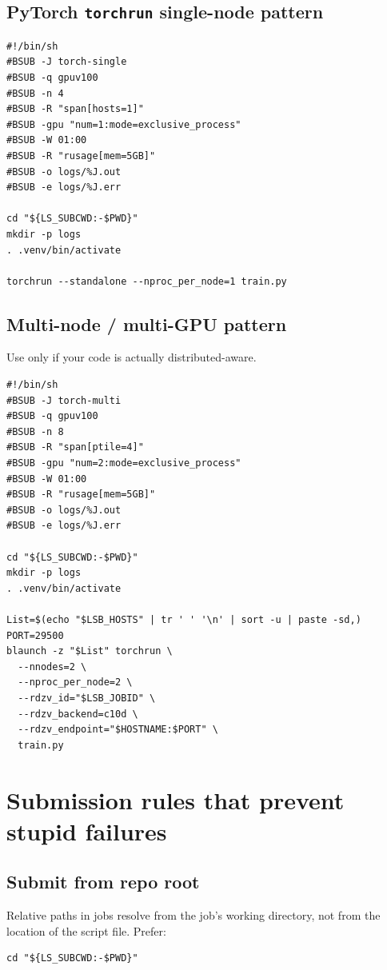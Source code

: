 \documentclass[11pt,a4paper]{article}
\begin{document}
\subsection{PyTorch \texttt{torchrun} single-node pattern}

\begin{lstlisting}[style=shell]
#!/bin/sh
#BSUB -J torch-single
#BSUB -q gpuv100
#BSUB -n 4
#BSUB -R "span[hosts=1]"
#BSUB -gpu "num=1:mode=exclusive_process"
#BSUB -W 01:00
#BSUB -R "rusage[mem=5GB]"
#BSUB -o logs/%J.out
#BSUB -e logs/%J.err

cd "${LS_SUBCWD:-$PWD}"
mkdir -p logs
. .venv/bin/activate

torchrun --standalone --nproc_per_node=1 train.py
\end{lstlisting}

\subsection{Multi-node / multi-GPU pattern}

Use only if your code is actually distributed-aware.

\begin{lstlisting}[style=shell]
#!/bin/sh
#BSUB -J torch-multi
#BSUB -q gpuv100
#BSUB -n 8
#BSUB -R "span[ptile=4]"
#BSUB -gpu "num=2:mode=exclusive_process"
#BSUB -W 01:00
#BSUB -R "rusage[mem=5GB]"
#BSUB -o logs/%J.out
#BSUB -e logs/%J.err

cd "${LS_SUBCWD:-$PWD}"
mkdir -p logs
. .venv/bin/activate

List=$(echo "$LSB_HOSTS" | tr ' ' '\n' | sort -u | paste -sd,)
PORT=29500
blaunch -z "$List" torchrun \
  --nnodes=2 \
  --nproc_per_node=2 \
  --rdzv_id="$LSB_JOBID" \
  --rdzv_backend=c10d \
  --rdzv_endpoint="$HOSTNAME:$PORT" \
  train.py
\end{lstlisting}

\section{Submission rules that prevent stupid failures}

\subsection{Submit from repo root}

Relative paths in jobs resolve from the job's working directory, not from the location of the script file. Prefer:

\begin{lstlisting}[style=shell]
cd "${LS_SUBCWD:-$PWD}"
\end{lstlisting}
\end{document}
